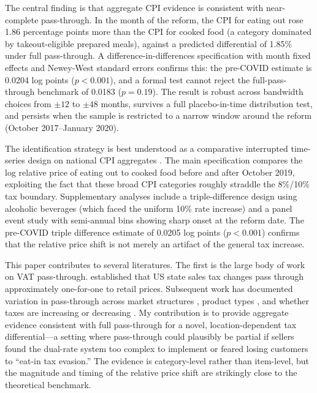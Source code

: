 \documentclass[12pt]{article}
\begin{document}
The central finding is that aggregate CPI evidence is consistent with near-complete pass-through. In the month of the reform, the CPI for eating out rose 1.86 percentage points more than the CPI for cooked food (a category dominated by takeout-eligible prepared meals), against a predicted differential of 1.85\% under full pass-through. A difference-in-differences specification with month fixed effects and Newey-West standard errors confirms this: the pre-COVID estimate is 0.0204 log points ($p < 0.001$), and a formal test cannot reject the full-pass-through benchmark of 0.0183 ($p = 0.19$). The result is robust across bandwidth choices from $\pm12$ to $\pm48$ months, survives a full placebo-in-time distribution test, and persists when the sample is restricted to a narrow window around the reform (October 2017--January 2020).

The identification strategy is best understood as a comparative interrupted time-series design on national CPI aggregates \citep{bertrand2004much}. The main specification compares the log relative price of eating out to cooked food before and after October 2019, exploiting the fact that these broad CPI categories roughly straddle the 8\%/10\% tax boundary. Supplementary analyses include a triple-difference design using alcoholic beverages (which faced the uniform 10\% rate increase) and a panel event study with semi-annual bins showing sharp onset at the reform date. The pre-COVID triple difference estimate of 0.0205 log points ($p < 0.001$) confirms that the relative price shift is not merely an artifact of the general tax increase.

This paper contributes to several literatures. The first is the large body of work on VAT pass-through. \citet{poterba1996retail} established that US state sales tax changes pass through approximately one-for-one to retail prices. Subsequent work has documented variation in pass-through across market structures \citep{weyl2013passthrough, benzarti2019really}, product types \citep{kosonen2015tax, harju2018incidence}, and whether taxes are increasing or decreasing \citep{benzarti2020passthrough}. My contribution is to provide aggregate evidence consistent with full pass-through for a novel, location-dependent tax differential---a setting where pass-through could plausibly be partial if sellers found the dual-rate system too complex to implement or feared losing customers to ``eat-in tax evasion.'' The evidence is category-level rather than item-level, but the magnitude and timing of the relative price shift are strikingly close to the theoretical benchmark.
\end{document}
